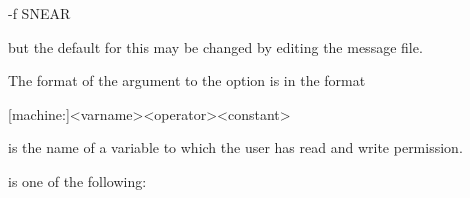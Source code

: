 \begin{expara}

-f SNEAR

\end{expara}

but the default for this may be changed by editing the message file.

The format of the argument to the  option is in the format

\begin{expara}

[machine:]{\textless}varname{\textgreater}{\textless}operator{\textgreater}{\textless}constant{\textgreater}

\end{expara}

 is the name of a variable to which the user has read and write permission.

 is one of the following:

